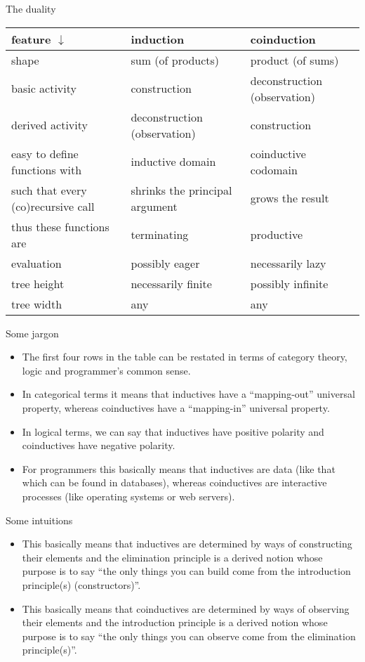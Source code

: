 \documentclass{beamer}
\begin{document}
\begin{frame}{The duality}
\begin{tabular}{ | p{3cm} | p{3cm} | p{3cm} | }
	\hline
	feature $\downarrow$ & induction & coinduction \\\hline
	shape & sum (of products) & product (of sums) \\\hline
	basic activity & construction & deconstruction (observation) \\\hline
	derived activity & deconstruction (observation) & construction \\\hline
	easy to define functions with & inductive domain & coinductive codomain \\\hline
	such that every (co)recursive call & shrinks the principal argument & grows the result \\\hline
	thus these functions are & terminating & productive \\\hline
	evaluation & possibly eager & necessarily lazy \\\hline
	tree height & necessarily finite & possibly infinite \\\hline
	tree width & any & any \\\hline
\end{tabular}
\end{frame}

\begin{frame}{Some jargon}
\begin{itemize}
	\item The first four rows in the table can be restated in terms of category theory, logic and programmer's common sense.
	\item In categorical terms it means that inductives have a ``mapping-out'' universal property, whereas coinductives have a ``mapping-in'' universal property.
	\item In logical terms, we can say that inductives have positive polarity and coinductives have negative polarity.
	\item For programmers this basically means that inductives are data (like that which can be found in databases), whereas coinductives are interactive processes (like operating systems or web servers).
	
\end{itemize}
\end{frame}

\begin{frame}{Some intuitions}
\begin{itemize}
	\item This basically means that inductives are determined by ways of constructing their elements and the elimination principle is a derived notion whose purpose is to say ``the only things you can build come from the introduction principle(s) (constructors)''.
	\item This basically means that coinductives are determined by ways of observing their elements and the introduction principle is a derived notion whose purpose is to say ``the only things you can observe come from the elimination principle(s)''.
\end{itemize}
\end{frame}
\end{document}
